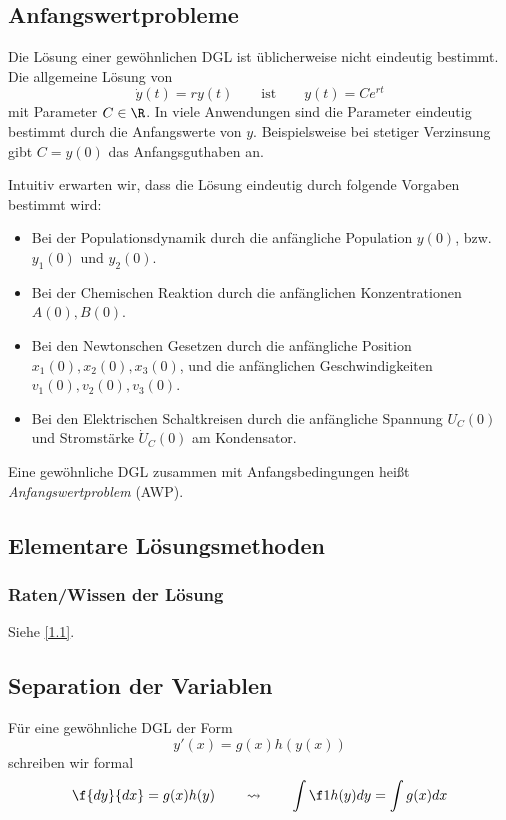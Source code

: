 \documentclass[
]{mycourse}
\begin{document}
\subsection{Anfangswertprobleme}


Die Lösung einer gewöhnlichen DGL ist üblicherweise nicht eindeutig bestimmt.
Die allgemeine Lösung von
\[
	\dot y(t) = ry(t)
	\qquad \text{ist} \qquad
	y(t) = Ce^{rt}
\]
mit Parameter $C \in \R$.
In viele Anwendungen sind die Parameter eindeutig bestimmt durch die Anfangswerte von $y$.
Beispielsweise bei stetiger Verzinsung gibt $C=y(0)$ das Anfangsguthaben an.

Intuitiv erwarten wir, dass die Lösung eindeutig durch folgende Vorgaben bestimmt wird:
\begin{itemize}
	\item
		Bei der Populationsdynamik durch die anfängliche Population $y(0)$, bzw. $y_1(0)$ und $y_2(0)$.
	\item
		Bei der Chemischen Reaktion durch die anfänglichen Konzentrationen $A(0), B(0)$.
	\item
		Bei den Newtonschen Gesetzen durch die anfängliche Position $x_1(0),x_2(0),x_3(0)$, und die anfänglichen Geschwindigkeiten $v_1(0), v_2(0), v_3(0)$.
	\item
		Bei den Elektrischen Schaltkreisen durch die anfängliche Spannung $U_C(0)$ und Stromstärke $\dot U_C(0)$ am Kondensator.
\end{itemize}
Eine gewöhnliche DGL zusammen mit Anfangsbedingungen heißt \emph{Anfangswertproblem} (AWP).


\subsection{Elementare Lösungsmethoden}


\subsubsection{Raten/Wissen der Lösung}

Siehe \ref{1.1}.

\subsection{Separation der Variablen}


Für eine gewöhnliche DGL der Form
\[
	y'(x) = g(x) h(y(x))
\]
schreiben wir formal
\[
	\f {dy}{dx} = g(x) h(y)
	\qquad \leadsto \qquad
	\int \f 1{h(y)} dy = \int g(x) dx
\]
\end{document}

